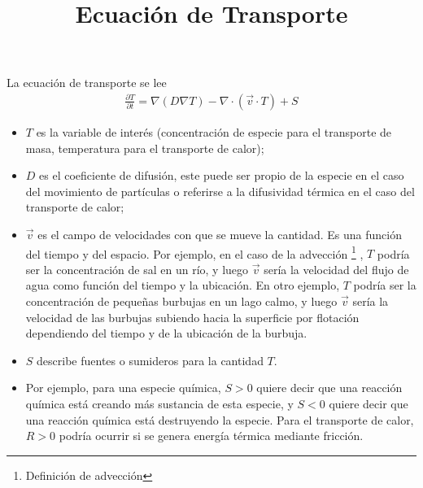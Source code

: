 \documentclass{article}
\title{Ecuación de Transporte}
\begin{document}
  \maketitle
  La ecuación de transporte se lee
  \begin{align}
    \frac{\partial T}{\partial t} = \nabla (D \nabla T) - \nabla \cdot (\vec{v} \cdot T) + S
  \end{align}
  \begin{itemize}
    \item \(T\) es la variable de interés (concentración de especie para el transporte de masa, temperatura para el transporte de calor);
    \item \(D\) es el coeficiente de difusión, este puede ser propio de la especie en el caso del movimiento de partículas o referirse a la difusividad térmica en el caso del transporte de calor;
    \item \(\vec{v}\) es el campo de velocidades con que se mueve la cantidad.
    Es una función del tiempo y del espacio.
    Por ejemplo, en el caso de la advección
    \footnote{Definición de advección}
    ,
    \(T\) podría ser la concentración de sal en un río, y luego \(\vec{v}\) sería la velocidad del flujo de agua como función del tiempo y la ubicación.
    En otro ejemplo, \(T\) podría ser la concentración de pequeñas burbujas en un lago calmo, y luego \(\vec{v}\) sería la velocidad de las burbujas subiendo hacia la superficie por flotación dependiendo del tiempo y de la ubicación de la burbuja.
    \item \(S\) describe fuentes o sumideros para la cantidad \(T\).
    \item Por ejemplo, para una especie química, \(S > 0\) quiere decir que una reacción química está creando más sustancia de esta especie, y \(S < 0\) quiere decir que una reacción química está destruyendo la especie.
    Para el transporte de calor, \(R > 0\) podría ocurrir si se genera energía térmica mediante fricción.
  \end{itemize}
  
\end{document}
